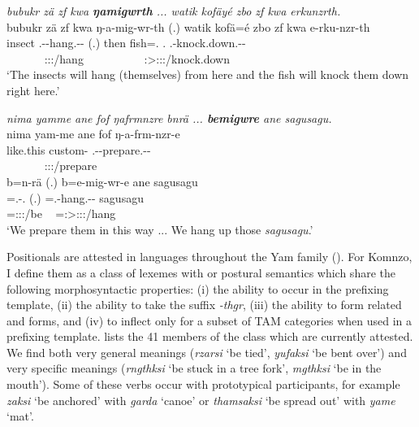 \begin{exe}
	\ex \emph{bubukr zä zf kwa \textbf{ŋamigwrth} ... watik kofäyé zbo zf kwa erkunzrth.}\\
	\glll bubukr zä zf kwa ŋ-a-mig-wr-th (.) watik kofä=é zbo zf kwa e-rku-nzr-th\\
	insect \Prox{} \Imm{} \Fut{} \M.\Alph-\Vc-hang.\Ext-\Ndu-\Stnsg{} (.) then fish=\Erg.\Nsg{} \Prox.\All{} \Imm{} \Fut{} \Stnsg.\Alph-knock.down.\Ext-\Ndu-\Stnsg\\
	~ ~ ~ ~ {\Stpl:\Sbj:\Nonpast:\Ipfv/hang} ~ ~ ~ ~ ~ ~ {\Stpl:\Sbj>\Stpl:\Obj:\Nonpast:\Ipfv/knock.down}\\
	\trans `The insects will hang (themselves) from here and the fish will knock them down right here.' 
	\label{ex326}
\end{exe}
\begin{exe}
	\ex \emph{nima yamme ane fof ŋafrmnzre bnrä ... \textbf{bemigwre} ane sagusagu.}\\
	\glll nima yam-me ane fof ŋ-a-frm-nzr-e \\
	like.this custom-\Ins{} \Dem{} \Emph{} \M.\Alph-\Vc-prepare.\Ext-\Ndu-\Fnsg{}\\
	~ ~ ~ ~ {\Fpl:\Sbj:\Nonpast:\Ipfv/prepare}\\
	\sn
	\glll b=n-rä (.) b=e-mig-wr-e ane sagusagu\\
	\Med=\Fnsg.\Alph-\Cop.\Ndu{} (.) \Med=\Stnsg.\Alph-hang.\Ext-\Ndu-\Fnsg{} \Dem{} sagusagu\\
	\footnotesize{\Med=\Fpl:\Sbj:\Nonpast:\Ipfv/be} ~ {\Med=\Fpl:\Sbj>\Stpl:\Obj:\Nonpast:\Ipfv/hang} ~ ~\\
	\trans `We prepare them in this way ... We hang up those \emph{sagusagu}.'\\ 
	\label{ex327}
\end{exe}

Positionals are attested in languages throughout the Yam family (\citealt{Evans:2014bz}). For Komnzo, I define them as a class of lexemes with  or postural semantics which share the following morphosyntactic properties: (i) the ability to occur in the prefixing template, (ii) the ability to take the  suffix \emph{-thgr}, (iii) the ability to form related  and   forms, and (iv) to inflect only for a subset of TAM categories when used in a prefixing template.  lists the 41 members of the class which are currently attested. We find both very general meanings (\emph{rzarsi} `be tied', \emph{yufaksi} `be bent over') and very specific meanings (\emph{rngthksi} `be stuck in a tree fork', \emph{mgthksi} `be in the mouth'). Some of these verbs occur with prototypical participants, for example \emph{zaksi} `be anchored' with \emph{garda} `canoe' or \emph{thamsaksi} `be spread out' with \emph{yame} `mat'.%

